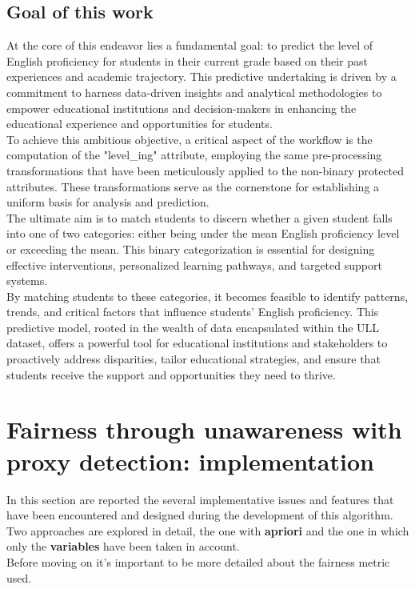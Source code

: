 \documentclass[12pt,a4paper,openright,twoside]{book}
\begin{document}
\subsection{Goal of this work}
At the core of this endeavor lies a fundamental goal: to predict the level of English proficiency for students in their current grade based on their past experiences and academic trajectory. This predictive undertaking is driven by a commitment to harness data-driven insights and analytical methodologies to empower educational institutions and decision-makers in enhancing the educational experience and opportunities for students. \\
To achieve this ambitious objective, a critical aspect of the workflow is the computation of the "level_ing" attribute, employing the same pre-processing transformations that have been meticulously applied to the non-binary protected attributes. These transformations serve as the cornerstone for establishing a uniform basis for analysis and prediction. \\
The ultimate aim is to match students to discern whether a given student falls into one of two categories: either being under the mean English proficiency level or exceeding the mean. This binary categorization is essential for designing effective interventions, personalized learning pathways, and targeted support systems. \\
By matching students to these categories, it becomes feasible to identify patterns, trends, and critical factors that influence students' English proficiency. This predictive model, rooted in the wealth of data encapsulated within the ULL dataset, offers a powerful tool for educational institutions and stakeholders to proactively address disparities, tailor educational strategies, and ensure that students receive the support and opportunities they need to thrive.

\section{Fairness through unawareness with proxy detection: implementation}
In this section are reported the several implementative issues and features that have been encountered and designed during the development of this algorithm. Two approaches are explored in detail, the one with \textbf{apriori} and the one in which only the \textbf{variables} have been taken in account. \\
Before moving on it's important to be more detailed about the fairness metric used.
\end{document}
